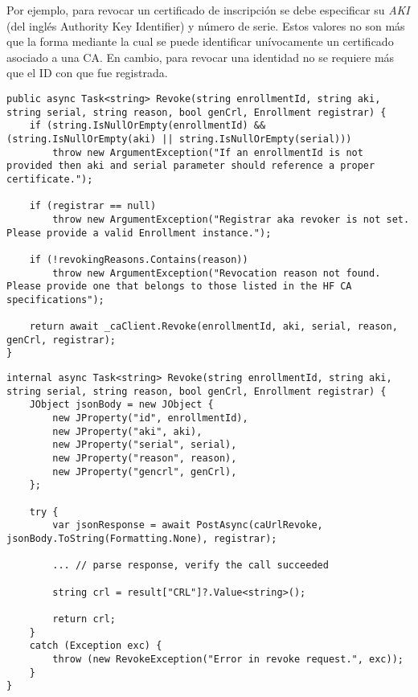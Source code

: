 Por ejemplo, para revocar un certificado de inscripción se debe especificar su \emph{AKI} (del ingl\'es Authority Key Identifier) y número de serie. Estos valores no son m\'as que la forma mediante la cual se puede identificar un\'ivocamente un certificado asociado a una CA. En cambio, para revocar una identidad no se requiere m\'as que el ID con que fue registrada.




\begin{lstlisting}[caption={M\'etodo \texttt{Revoke} de la clase \texttt{CAService}.}, label={code:revCaService}]
public async Task<string> Revoke(string enrollmentId, string aki, string serial, string reason, bool genCrl, Enrollment registrar) {
	if (string.IsNullOrEmpty(enrollmentId) && (string.IsNullOrEmpty(aki) || string.IsNullOrEmpty(serial)))
		throw new ArgumentException("If an enrollmentId is not provided then aki and serial parameter should reference a proper certificate.");
	
	if (registrar == null)
		throw new ArgumentException("Registrar aka revoker is not set. Please provide a valid Enrollment instance.");
	
	if (!revokingReasons.Contains(reason))
		throw new ArgumentException("Revocation reason not found. Please provide one that belongs to those listed in the HF CA specifications");
	
	return await _caClient.Revoke(enrollmentId, aki, serial, reason, genCrl, registrar);
}
\end{lstlisting}


\begin{lstlisting}[caption={M\'etodo \texttt{Revoke} de la clase \texttt{CAClient}.}, label={code:revCaClient}]
internal async Task<string> Revoke(string enrollmentId, string aki, string serial, string reason, bool genCrl, Enrollment registrar) {
	JObject jsonBody = new JObject {
		new JProperty("id", enrollmentId),
		new JProperty("aki", aki),
		new JProperty("serial", serial),
		new JProperty("reason", reason),
		new JProperty("gencrl", genCrl),
	};
	
	try {
		var jsonResponse = await PostAsync(caUrlRevoke, jsonBody.ToString(Formatting.None), registrar);

		... // parse response, verify the call succeeded
	
		string crl = result["CRL"]?.Value<string>();

		return crl;
	}
	catch (Exception exc) {
		throw (new RevokeException("Error in revoke request.", exc));
	}
}
\end{lstlisting}

